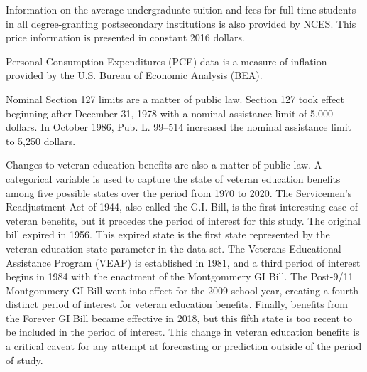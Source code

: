\documentclass[review]{elsarticle}
\begin{document}
    Information on the average undergraduate tuition and fees for full-time students in all degree-granting postsecondary institutions
    is also provided by NCES\cite{nces_2017}.
    This price information is presented in constant 2016 dollars.

    Personal Consumption Expenditures (PCE) data is a measure of inflation provided by the U.S. Bureau of Economic Analysis (BEA)\cite{bea_2020}.

    Nominal Section 127 limits are a matter of public law.
    Section 127 took effect beginning after December 31, 1978 with a nominal assistance limit of 5,000 dollars\cite{plaw95_600_1978}.
    In October 1986, Pub. L. 99–514 increased the nominal assistance limit to 5,250 dollars\cite{plaw99_514_1986}.
    
    Changes to veteran education benefits are also a matter of public law.
    A categorical variable is used to capture the state of veteran education benefits among five possible states over the period from 1970 to 2020.
    The Servicemen's Readjustment Act of 1944,
    also called the G.I. Bill,
    is the first interesting case of veteran benefits,
    but it precedes the period of interest for this study.
    The original bill expired in 1956.
    This expired state is the first state represented by the veteran education state parameter in the data set.
    The Veterans Educational Assistance Program (VEAP) is established in 1981,
    and a third period of interest begins in 1984 with the enactment of the Montgommery GI Bill.
    The Post-9/11 Montgommery GI Bill went into effect for the 2009 school year,
    creating a fourth distinct period of interest for veteran education benefits.
    Finally, benefits from the Forever GI Bill became effective in 2018,
    but this fifth state is too recent to be included in the period of interest.
    This change in veteran education benefits is a critical caveat for any attempt at forecasting or prediction outside of the period of study.

\end{document}
